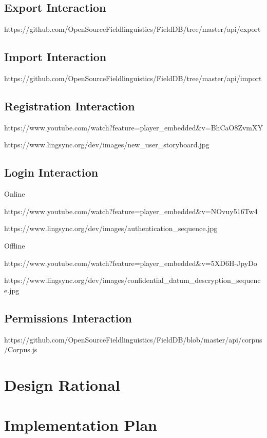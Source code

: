 \documentclass[12pt]{article}
\begin{document}
\subsection{Export Interaction}

https://github.com/OpenSourceFieldlinguistics/FieldDB/tree/master/api/export

\subsection{Import Interaction}

https://github.com/OpenSourceFieldlinguistics/FieldDB/tree/master/api/import

\subsection{Registration Interaction}

https://www.youtube.com/watch?feature=player\_embedded\&v=BhCaO8ZvmXY

https://www.lingsync.org/dev/images/new\_user\_storyboard.jpg

\subsection{Login Interaction}

Online 

https://www.youtube.com/watch?feature=player\_embedded\&v=NOvuy516Tw4

https://www.lingsync.org/dev/images/authentication\_sequence.jpg

Offline 

https://www.youtube.com/watch?feature=player\_embedded\&v=5XD6H-JpyDo

https://www.lingsync.org/dev/images/confidential\_datum\_descryption\_sequence.jpg



\subsection{Permissions Interaction}

https://github.com/OpenSourceFieldlinguistics/FieldDB/blob/master/api/corpus/Corpus.js

\section{Design Rational}


\section{Implementation Plan}
\end{document}
